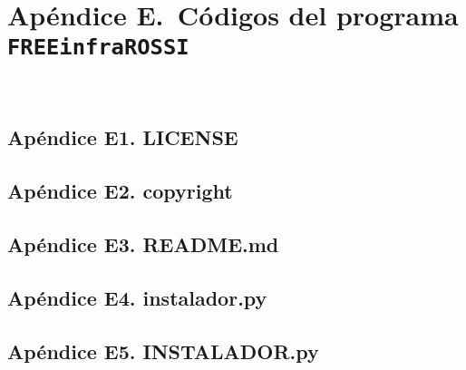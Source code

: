\section{Ap\'endice E.\, C\'odigos del programa \texttt{FREEinfraROSSI}}\,\label{app:appE}



\subsection{\footnotesize Ap\'endice E1. LICENSE} \label{app:appE1}
 

\subsection{\footnotesize Ap\'endice E2. copyright}\label{app:appE2}
 
\subsection{\footnotesize Ap\'endice E3. README.md} \label{app:appE3}
 

\subsection{\footnotesize Ap\'endice E4. instalador.py} \label{app:appE4}
 
 
\subsection{\footnotesize Ap\'endice E5. INSTALADOR.py}\label{app:appE5}


